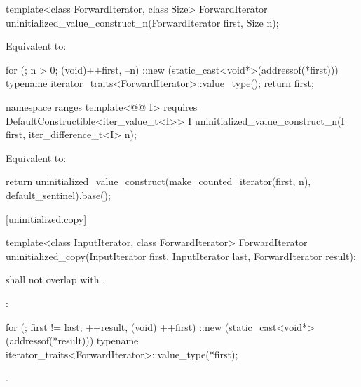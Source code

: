 %
\begin{itemdecl}
template<class ForwardIterator, class Size>
  ForwardIterator uninitialized_value_construct_n(ForwardIterator first, Size n);
\end{itemdecl}

\begin{itemdescr}
\pnum
\effects
Equivalent to:
\begin{codeblock}
for (; n > 0; (void)++first, --n)
  ::new (static_cast<void*>(addressof(*first)))
    typename iterator_traits<ForwardIterator>::value_type();
return first;
\end{codeblock}
\end{itemdescr}

\begin{addedblock}
%
\begin{itemdecl}
namespace ranges {
  template<@@ I>
      requires DefaultConstructible<iter_value_t<I>>
    I uninitialized_value_construct_n(I first, iter_difference_t<I> n);
}
\end{itemdecl}

\begin{itemdescr}
\pnum
\effects Equivalent to:
\begin{codeblock}
return uninitialized_value_construct(make_counted_iterator(first, n),
                                     default_sentinel{}).base();
\end{codeblock}
\end{itemdescr}
\end{addedblock}

[uninitialized.copy]{}

%
\begin{itemdecl}
template<class InputIterator, class ForwardIterator>
  ForwardIterator uninitialized_copy(InputIterator first, InputIterator last,
                                     ForwardIterator result);
\end{itemdecl}

\begin{itemdescr}
\begin{addedblock}
\pnum
\expects
{} shall not overlap with .
\end{addedblock}

\pnum
\effects
{}:
\begin{codeblock}
for (; first != last; ++result, (void) ++first)
  ::new (static_cast<void*>(addressof(*result)))
    typename iterator_traits<ForwardIterator>::value_type(*first);
\end{codeblock}

\pnum
\returns
{}.
\end{itemdescr}

